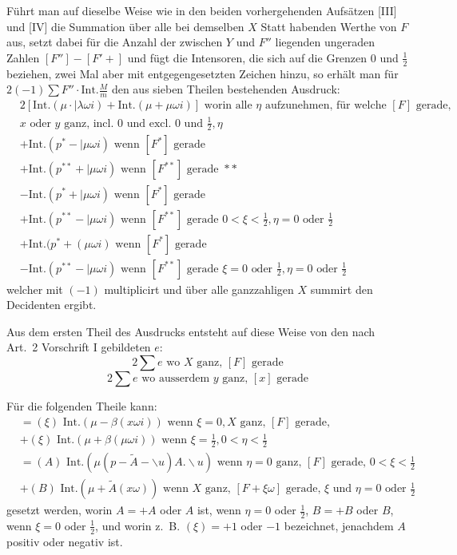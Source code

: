 \documentclass[12pt,a4paper]{article}
\begin{document}
Führt man auf dieselbe Weise wie in den beiden vorhergehenden Aufsätzen [III] und [IV] die Summation über alle bei demselben $X$ Statt habenden Werthe von $F$ aus, setzt dabei für die Anzahl der zwischen $Y$ und $F''$ liegenden ungeraden Zahlen $[F''] - [F' + ]$ und fügt die Intensoren, die sich auf die Grenzen $0$ und $\frac{1}{2}$ beziehen, zwei Mal aber mit entgegengesetzten Zeichen hinzu, so erhält man für $2(-1) \sum F'' \cdot \text{Int.} \frac{M}{m}$ den aus sieben Theilen bestehenden Ausdruck:
\begin{align*}
&2[\text{Int.}(\mu \cdot |\lambda \omega i) + \text{Int.}(\mu + \mu \omega i)] \text{ worin alle } \eta \text{ aufzunehmen, für welche } [F] \text{ gerade,}\\
&x \text{ oder } y \text{ ganz, incl. } 0 \text{ und excl. } 0 \text{ und } \frac{1}{2}, \eta\\
&+ \text{Int.}(p^* - |\mu \omega i) \text{ wenn } [F^*] \text{ gerade}\\
&+ \text{Int.}(p^{**} + |\mu \omega i) \text{ wenn } [F^{**}] \text{ gerade } * *\\
&- \text{Int.}(p^* + |\mu \omega i) \text{ wenn } [F^*] \text{ gerade}\\
&+ \text{Int.}(p^{**} - |\mu \omega i) \text{ wenn } [F^{**}] \text{ gerade } 0 < \xi < \frac{1}{2}, \eta = 0 \text{ oder } \frac{1}{2}\\
&+ \text{Int.}(p^* + (\mu \omega i) \text{ wenn } [F^*] \text{ gerade}\\
&- \text{Int.}(p^{**} - |\mu \omega i) \text{ wenn } [F^{**}] \text{ gerade } \xi = 0 \text{ oder } \frac{1}{2}, \eta = 0 \text{ oder } \frac{1}{2}
\end{align*}
welcher mit $(-1)$ multiplicirt und über alle ganzzahligen $X$ summirt den Decidenten ergibt.

Aus dem ersten Theil des Ausdrucks entsteht auf diese Weise von den nach Art.~2 Vorschrift I gebildeten $e$:
\[
2\sum e \text{ wo } X \text{ ganz, } [F] \text{ gerade}
\]
\[
2\sum e \text{ wo ausserdem } y \text{ ganz, } [x] \text{ gerade}
\]

Für die folgenden Theile kann:
\begin{align*}
&= (\xi) \text{ Int.}(\mu - \beta(x\omega i)) \text{ wenn } \xi = 0, X \text{ ganz, } [F] \text{ gerade,}\\
&+ (\xi) \text{ Int.}(\mu + \beta(\mu \omega i)) \text{ wenn } \xi = \frac{1}{2}, 0 < \eta < \frac{1}{2}\\
&= (A) \text{ Int.}(\mu(p - \tilde{A} - \backslash u) A. \backslash u) \text{ wenn } \eta = 0 \text{ ganz, } [F] \text{ gerade, } 0 < \xi < \frac{1}{2}\\
&+ (B) \text{ Int.}(\mu + \tilde{A}(x\omega)) \text{ wenn } X \text{ ganz, } [F + \xi\omega] \text{ gerade, } \xi \text{ und } \eta = 0 \text{ oder } \frac{1}{2}
\end{align*}
gesetzt werden, worin $A = +A$ oder $A$ ist, wenn $\eta = 0$ oder $\frac{1}{2}$, $B = +B$ oder $B$, wenn $\xi = 0$ oder $\frac{1}{2}$, und worin z.~B. $(\xi) = +1$ oder $-1$ bezeichnet, jenachdem $A$ positiv oder negativ ist.
\end{document}
